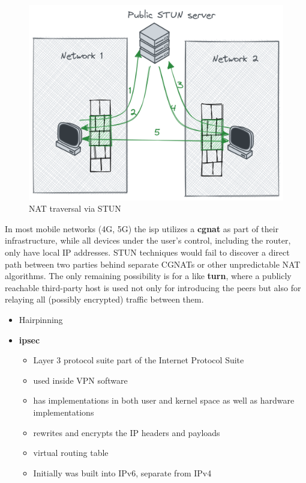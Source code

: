 \begin{figure}
\centering
\includegraphics[width=\textwidth,height=0.25\textheight]{thesis/../figures/nat-traversal.png}
\caption{NAT traversal via STUN\label{nat-traversal}}
\end{figure}

In most mobile networks (4G, 5G) the \gls{isp} utilizes a
\textbf{\gls{cgnat}} as part of their infrastructure, while all devices
under the user's control, including the router, only have local IP
addresses. STUN techniques would fail to discover a direct path between
two parties behind separate CGNATs or other unpredictable NAT
algorithms. The only remaining possibility is for a like
\textbf{\acrfull{turn}}, where a publicly reachable third-party host is
used not only for introducing the peers but also for relaying all
(possibly encrypted) traffic between them.

\begin{itemize}
\item
  Hairpinning
\item
  \textbf{\acrfull{ipsec}}

  \begin{itemize}
  \tightlist
  \item
    Layer 3 protocol suite part of the Internet Protocol Suite
  \item
    used inside VPN software
  \item
    has implementations in both user and kernel space as well as
    hardware implementations
  \item
    rewrites and encrypts the IP headers and payloads
  \item
    virtual routing table
  \item
    Initially was built into IPv6, separate from IPv4
  \end{itemize}
\end{itemize}

